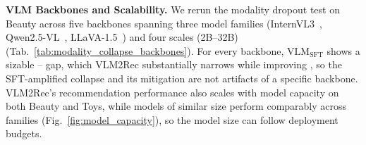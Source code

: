 \noindent\textbf{VLM Backbones and Scalability.}
\label{app:modality_collapse_backbones}
\label{app:model_scalability}
We rerun the modality dropout test on Beauty across five backbones spanning three model families (InternVL3~\cite{internvl3}, Qwen2.5-VL~\cite{qwen2.5-vl}, LLaVA-1.5~\cite{llava}) and four scales (2B--32B) (Tab.~\ref{tab:modality_collapse_backbones}).
For every backbone, $\text{VLM}_{\text{SFT}}$ shows a sizable \TEXTset{}--\VISIONset{} gap, which VLM2Rec substantially narrows while improving \FUSIONset{}, so the SFT-amplified collapse and its mitigation are not artifacts of a specific backbone.
VLM2Rec's recommendation performance also scales with model capacity on both Beauty and Toys, while models of similar size perform comparably across families (Fig.~\ref{fig:model_capacity}), so the model size can follow deployment budgets.

\begin{table}[!h]
\centering
\caption{VLM2Rec on Qwen3-VL-Embedding in the $\text{VLM2Rec}_{\text{plug}}$ setting (SASRec, N@20). Base: the released model without our training. Gap: (\TEXTset{}$-$\VISIONset{})/\VISIONset{}; lower is better.}
\label{tab:qwen3_vl_embedding}
\setlength{\tabcolsep}{7pt}
\renewcommand{\arraystretch}{0.5}
\end{table}

